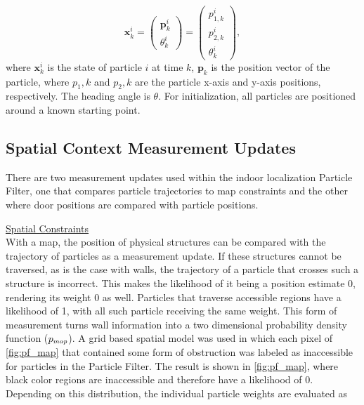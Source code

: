 \begin{equation}
\mathbf{x}_k^i = \left(\begin{array}{l}
	\mathbf{p}_{k}^i   \\
	\theta_k^i
\end{array}\right) = \left(\begin{array}{l}
p_{1,k}^i   \\
p_{2,k}^i  \\
\theta_k^i
\end{array}\right), 
\label{eq:pf_state}
\end{equation}
where $\mathbf{x}^i_k$ is the state of particle $i$ at time $k$, $\mathbf{p}_k$ is the position vector of the particle, where $p_1,k $ and $p_2,k$ are the particle x-axis and y-axis positions, respectively. The heading angle is  $\theta$. For initialization,  all particles are positioned around a known starting point. \par 

\subsection{Spatial Context Measurement Updates}
	There are two measurement updates used within the indoor localization Particle Filter, one that compares particle trajectories to map constraints and the other where door positions are compared with particle positions. \par 
	
	\underline{Spatial Constraints}\\
   With a map, the position of physical structures can be compared with the trajectory of particles as a measurement update. If these structures cannot be traversed, as is the case with walls, the trajectory of a particle that crosses such a structure is incorrect. This makes the likelihood of it being a position estimate 0, rendering its weight 0 as well. Particles that traverse accessible regions have a likelihood of 1, with all such particle receiving the same weight. This form of measurement turns wall information into a two dimensional probability density function ($p_{\scaleto{map}{4pt}}$). A grid based spatial model was used in which each pixel of \cref{fig:pf_map} that contained some form of obstruction was labeled as inaccessible for particles in the Particle Filter. The result is shown in \cref{fig:pf_map}, where black color regions are inaccessible and therefore have a likelihood of 0.\\
   Depending on this distribution, the individual particle weights are evaluated as 
   
